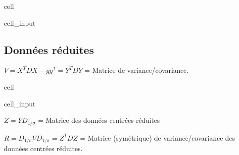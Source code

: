 \documentclass[letterpaper,10pt,english]{jupyterBook}
\begin{document}
\begin{sphinxuseclass}{cell}\begin{sphinxVerbatimInput}

\begin{sphinxuseclass}{cell_input}
\begin{sphinxVerbatim}[commandchars=\\\{\}]
  
      
\end{sphinxVerbatim}

\end{sphinxuseclass}\end{sphinxVerbatimInput}

\end{sphinxuseclass}

\subsection{Données réduites}
\label{\detokenize{acp:id2}}
\sphinxAtStartPar
\(V=X^TDX-gg^T=Y^TDY\) = Matrice de variance/covariance.

\begin{sphinxuseclass}{cell}\begin{sphinxVerbatimInput}

\begin{sphinxuseclass}{cell_input}
\begin{sphinxVerbatim}[commandchars=\\\{\}]
  
      
\end{sphinxVerbatim}

\end{sphinxuseclass}\end{sphinxVerbatimInput}

\end{sphinxuseclass}
\sphinxAtStartPar
\(Z = Y D_{1/\sigma}\) = Matrice des données centrées réduites

\sphinxAtStartPar
\(R = D_{1/\sigma}VD_{1/\sigma} = Z^T  D  Z\) = Matrice (symétrique) de variance/covariance des données centrées réduites.
\end{document}
